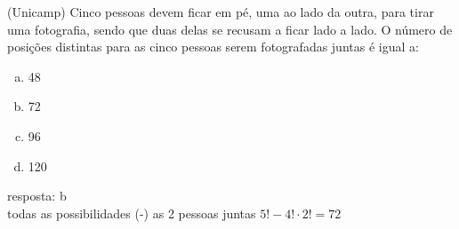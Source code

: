 \begin{ex}
    (Unicamp) Cinco pessoas devem ficar em pé, uma ao lado da outra, para tirar uma fotografia, sendo que duas delas se recusam a ficar lado a lado. O número de posições distintas para as cinco pessoas serem fotografadas juntas é igual a:
    \begin{enumerate} [(a)]
        \item 48
        \item 72
        \item 96
        \item 120
    \end{enumerate}
      \begin{sol}
       resposta: b \\
       todas as possibilidades (-) as 2 pessoas juntas \hspace{0,3cm} $5! - 4!\cdot2! = 72$
      \end{sol}
  \end{ex}